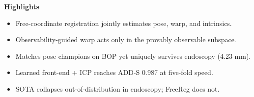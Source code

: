 \documentclass{article}
\begin{document}
\begin{center}\textbf{Highlights}\end{center}
\begin{itemize}
\item Free-coordinate registration jointly estimates pose, warp, and intrinsics.
\item Observability-guided warp acts only in the provably observable subspace.
\item Matches pose champions on BOP yet uniquely survives endoscopy (4.23 mm).
\item Learned front-end + ICP reaches ADD-S 0.987 at five-fold speed.
\item SOTA collapses out-of-distribution in endoscopy; FreeReg does not.
\end{itemize}
\end{document}
